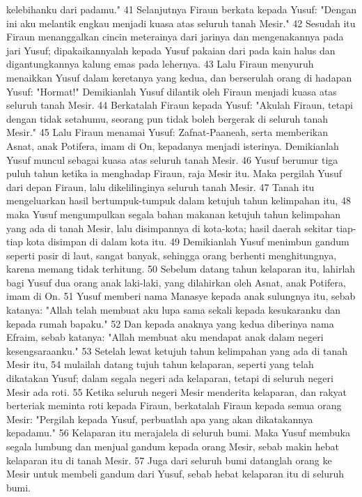 \begin{biblechapter}
kelebihanku dari padamu." 41 Selanjutnya Firaun berkata kepada Yusuf: "Dengan ini aku melantik engkau menjadi kuasa atas seluruh tanah Mesir." 42 Sesudah itu Firaun menanggalkan cincin meterainya dari jarinya dan mengenakannya pada jari Yusuf; dipakaikannyalah kepada Yusuf pakaian dari pada kain halus dan digantungkannya kalung emas pada lehernya. 43 Lalu Firaun menyuruh menaikkan Yusuf dalam keretanya yang kedua, dan berserulah orang di hadapan Yusuf: "Hormat!" Demikianlah Yusuf dilantik oleh Firaun menjadi kuasa atas seluruh tanah Mesir. 44 Berkatalah Firaun kepada Yusuf: "Akulah Firaun, tetapi dengan tidak setahumu, seorang pun tidak boleh bergerak di seluruh tanah Mesir." 45 Lalu Firaun menamai Yusuf: Zafnat-Paaneah, serta memberikan Asnat, anak Potifera, imam di On, kepadanya menjadi isterinya. Demikianlah Yusuf muncul sebagai kuasa atas seluruh tanah Mesir. 46 Yusuf berumur tiga puluh tahun ketika ia menghadap Firaun, raja Mesir itu. Maka pergilah Yusuf dari depan Firaun, lalu dikelilinginya seluruh tanah Mesir. 47 Tanah itu mengeluarkan hasil bertumpuk-tumpuk dalam ketujuh tahun kelimpahan itu, 48 maka Yusuf mengumpulkan segala bahan makanan ketujuh tahun kelimpahan yang ada di tanah Mesir, lalu disimpannya di kota-kota; hasil daerah sekitar tiap-tiap kota disimpan di dalam kota itu. 49 Demikianlah Yusuf menimbun gandum seperti pasir di laut, sangat banyak, sehingga orang berhenti menghitungnya, karena memang tidak terhitung. 50 Sebelum datang tahun kelaparan itu, lahirlah bagi Yusuf dua orang anak laki-laki, yang dilahirkan oleh Asnat, anak Potifera, imam di On. 51 Yusuf memberi nama Manasye kepada anak sulungnya itu, sebab katanya: "Allah telah membuat aku lupa sama sekali kepada kesukaranku dan kepada rumah bapaku." 52 Dan kepada anaknya yang kedua diberinya nama Efraim, sebab katanya: "Allah membuat aku mendapat anak dalam negeri kesengsaraanku." 53 Setelah lewat ketujuh tahun kelimpahan yang ada di tanah Mesir itu, 54 mulailah datang tujuh tahun kelaparan, seperti yang telah dikatakan Yusuf; dalam segala negeri ada kelaparan, tetapi di seluruh negeri Mesir ada roti. 55 Ketika seluruh negeri Mesir menderita kelaparan, dan rakyat berteriak meminta roti kepada Firaun, berkatalah Firaun kepada semua orang Mesir: "Pergilah kepada Yusuf, perbuatlah apa yang akan dikatakannya kepadamu." 56 Kelaparan itu merajalela di seluruh bumi. Maka Yusuf membuka segala lumbung dan menjual gandum kepada orang Mesir, sebab makin hebat kelaparan itu di tanah Mesir. 57 Juga dari seluruh bumi datanglah orang ke Mesir untuk membeli gandum dari Yusuf, sebab hebat kelaparan itu di seluruh bumi.
\end{biblechapter}

